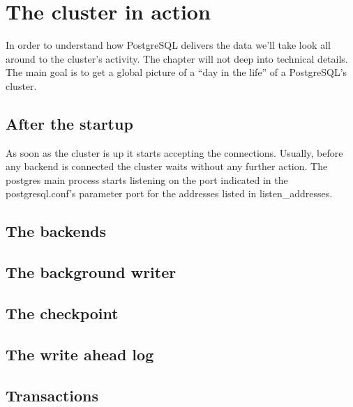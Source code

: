 \chapter{The cluster in action}
In order to understand how PostgreSQL delivers the data we'll take look all around to the cluster's 
activity. The chapter will not deep into technical details. The main goal is to get a global picture of a 
``day in the life'' of a PostgreSQL's cluster.

\section{After the startup}
As soon as the cluster is up it starts accepting the connections. Usually, before any backend is connected 
the cluster waits without any further action. The postgres main process starts listening on the port 
indicated in the postgresql.conf's parameter port for the addresses listed in listen\_addresses. 


\section{The backends}

\section{The background writer}

\section{The checkpoint}

\section{The write ahead log}

\section{Transactions}

